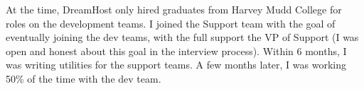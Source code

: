 %
%
At the time, DreamHost only hired graduates from Harvey Mudd College for roles on the development teams. I joined the
Support team with the goal of eventually joining the dev teams, with the full support the VP of Support (I was open and
honest about this goal in the interview process). Within 6 months, I was writing utilities for the support teams. A few
months later, I was working 50\% of the time with the dev team.
